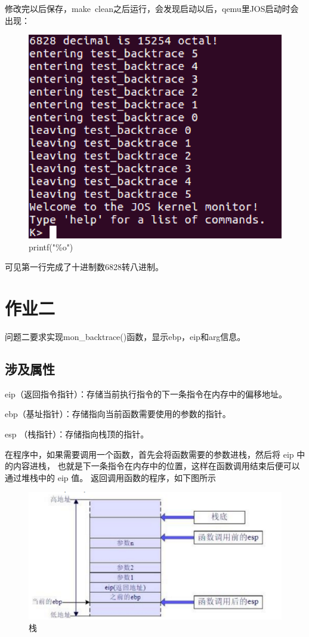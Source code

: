 \documentclass[12pt,a4paper,UTF8]{article}
\begin{document}
修改完以后保存，make\ clean之后运行，会发现启动以后，qemu里JOS启动时会出现：

\begin{figure}[H]
    \centering
    \includegraphics[width = .75\linewidth]{img/h1_1.png}
    \caption{printf("\%o")}
    \label{fig::figure1}
\end{figure}

可见第一行完成了十进制数6828转八进制。

\section{作业二}

\setcounter{table}{0}
\setcounter{figure}{0}

问题二要求实现mon\_backtrace()函数，显示ebp，eip和arg信息。

	\subsection{涉及属性}
	eip（返回指令指针）：存储当前执行指令的下一条指令在内存中的偏移地址。

	ebp（基址指针）：存储指向当前函数需要使用的参数的指针。

	esp （栈指针）：存储指向栈顶的指针。

	在程序中，如果需要调用一个函数，首先会将函数需要的参数进栈，然后将 eip 中的内容进栈，
	也就是下一条指令在内存中的位置，这样在函数调用结束后便可以通过堆栈中的 eip 值。
	返回调用函数的程序，如下图所示
	\begin{figure}[H]
		\centering
		\includegraphics[width = .8\linewidth]{img/1.png}
		\caption{栈}
		\label{fig::figure2-1}
	\end{figure}
\end{document}
